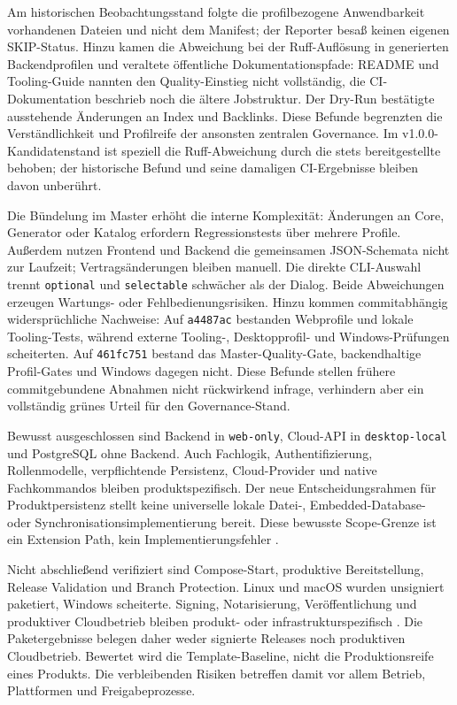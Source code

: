 Am historischen Beobachtungsstand folgte die profilbezogene Anwendbarkeit
vorhandenen Dateien und nicht dem Manifest; der Reporter besaß keinen eigenen
SKIP-Status. Hinzu kamen die Abweichung bei der Ruff-Auflösung in generierten
Backendprofilen und veraltete öffentliche Dokumentationspfade: README und
Tooling-Guide nannten den Quality-Einstieg nicht vollständig, die
CI-Dokumentation beschrieb noch die ältere Jobstruktur. Der Dry-Run bestätigte
ausstehende Änderungen an Index und Backlinks. Diese Befunde begrenzten die
Verständlichkeit und Profilreife der ansonsten zentralen Governance. Im
v1.0.0-Kandidatenstand ist speziell die Ruff-Abweichung durch die stets
bereitgestellte  behoben; der historische Befund und seine
damaligen CI-Ergebnisse bleiben davon unberührt.

Die Bündelung im Master erhöht die interne Komplexität: Änderungen an Core,
Generator oder Katalog erfordern Regressionstests über mehrere Profile.
Außerdem nutzen Frontend und Backend die gemeinsamen JSON-Schemata nicht zur
Laufzeit; Vertragsänderungen bleiben manuell. Die direkte CLI-Auswahl trennt
\texttt{optional} und \texttt{selectable} schwächer als der Dialog. Beide
Abweichungen erzeugen Wartungs- oder Fehlbedienungsrisiken. Hinzu kommen
commitabhängig widersprüchliche Nachweise: Auf \texttt{a4487ac} bestanden
Webprofile und lokale Tooling-Tests, während externe Tooling-, Desktopprofil-
und Windows-Prüfungen scheiterten. Auf \texttt{461fc751} bestand das
Master-Quality-Gate, backendhaltige Profil-Gates und Windows dagegen nicht.
Diese Befunde stellen frühere commitgebundene Abnahmen nicht rückwirkend
infrage, verhindern aber ein vollständig grünes Urteil für den
Governance-Stand.

Bewusst ausgeschlossen sind Backend in \texttt{web-only}, Cloud-API in
\texttt{desktop-local} und PostgreSQL ohne Backend. Auch Fachlogik,
Authentifizierung, Rollenmodelle, verpflichtende Persistenz, Cloud-Provider
und native Fachkommandos bleiben produktspezifisch. Der neue Entscheidungsrahmen
für Produktpersistenz stellt keine universelle lokale Datei-,
Embedded-Database- oder Synchronisationsimplementierung bereit. Diese bewusste
Scope-Grenze ist ein Extension Path, kein Implementierungsfehler
\parencite{kleiveist2026persistence}.

Nicht abschließend verifiziert sind Compose-Start, produktive Bereitstellung,
Release Validation und Branch Protection. Linux und macOS wurden unsigniert
paketiert, Windows scheiterte. Signing, Notarisierung, Veröffentlichung und
produktiver Cloudbetrieb bleiben produkt- oder infrastrukturspezifisch
\parencite{kleiveist2026governance-core-run,kleiveist2026governance-desktop-run,kleiveist2026acceptance}.
Die Paketergebnisse belegen daher weder signierte Releases noch produktiven
Cloudbetrieb. Bewertet wird die Template-Baseline, nicht die Produktionsreife
eines Produkts.
Die verbleibenden Risiken betreffen damit vor allem Betrieb, Plattformen und
Freigabeprozesse.
